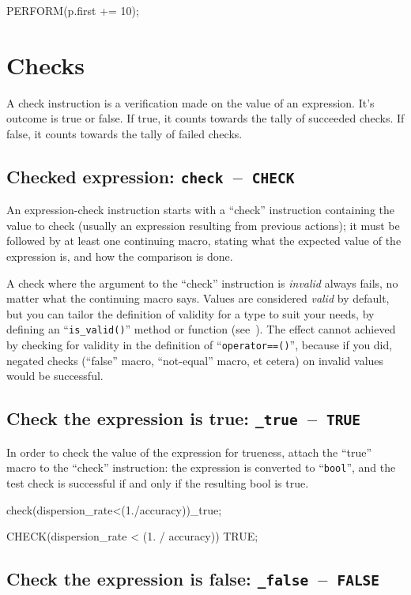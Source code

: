 \documentclass[twoside, a4paper, article]{memoir}
\newcommand*\testudocolor{\color{red!80!blue}}
\newcommand*\testudo[1]{\texttt{\testudocolor{}#1}}
\newcommand*\testudopair[2]{\testudo{#1}~--~\testudo{#2}}
\newcommand\subsectiontestudopair[3]{%
  \subsection[#1]{#1: \testudopair{#2}{#3}}}
\begin{document}
\begin{cpplisting}
PERFORM(p.first += 10);
\end{cpplisting}


\section{Checks}
\label{sec:checks}

A check instruction is a verification made on the value of an expression.  It's
outcome is true or false.  If true, it counts towards the tally of succeeded
checks.  If false, it counts towards the tally of failed checks.

\subsectiontestudopair{Checked expression}{check}{CHECK}
\label{sec:checked-expression}

An expression-check instruction starts with a ``check'' instruction containing
the value to check (usually an expression resulting from previous actions); it
must be followed by at least one continuing macro, stating what the expected
value of the expression is, and how the comparison is done.

A check where the argument to the ``check'' instruction is \emph{invalid}
always fails, no matter what the continuing macro says.  Values are considered
\emph{valid} by default, but you can tailor the definition of validity for a
type to suit your needs, by defining an ``\texttt{is\_valid()}'' method or
function (see~).  The effect cannot achieved by checking for
validity in the definition of ``\texttt{operator==()}'', because if you did,
negated checks (``false'' macro, ``not-equal'' macro, et cetera) on invalid
values would be successful.

\subsectiontestudopair{Check the expression is true}{\_true}{TRUE}
\label{sec:check-expression-true}

In order to check the value of the expression for trueness, attach the ``true''
macro to the ``check'' instruction: the expression is converted to
``\texttt{bool}'', and the test check is successful if and only if the
resulting bool is true.

\begin{cpplisting}
check(dispersion_rate<(1./accuracy))_true;
\end{cpplisting}

\begin{cpplisting}
CHECK(dispersion_rate < (1. / accuracy)) TRUE;
\end{cpplisting}

\subsectiontestudopair{Check the expression is false}{\_false}{FALSE}
\label{sec:check-expression-true}
\end{document}
